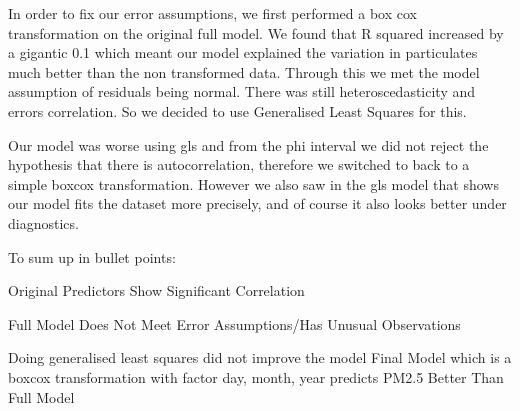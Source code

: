 \documentclass[
]{report}
\begin{document}
In order to fix our error assumptions, we first performed a box cox
transformation on the original full model. We found that R squared
increased by a gigantic 0.1 which meant our model explained the
variation in particulates much better than the non transformed data.
Through this we met the model assumption of residuals being normal.
There was still heteroscedasticity and errors correlation. So we decided
to use Generalised Least Squares for this.

Our model was worse using gls and from the phi interval we did not
reject the hypothesis that there is autocorrelation, therefore we
switched to back to a simple boxcox transformation. However we also saw
in the gls model that shows our model fits the dataset more precisely,
and of course it also looks better under diagnostics.

To sum up in bullet points:

Original Predictors Show Significant Correlation

Full Model Does Not Meet Error Assumptions/Has Unusual Observations

Doing generalised least squares did not improve the model Final Model
which is a boxcox transformation with factor day, month, year predicts
PM2.5 Better Than Full Model
\end{document}
